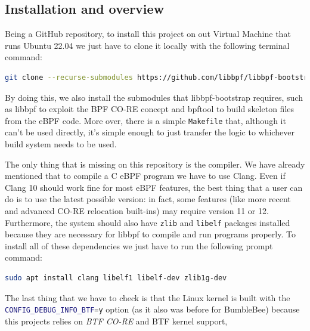 \subsection{Installation and overview}

Being a GitHub repository, to install this project on out Virtual Machine that runs Ubuntu 22.04 we just have to clone it locally with the following terminal command:

\begin{lstlisting}[style=commandline, language=bash, caption={Clone libbpf-bootstrap command.}]
	git clone --recurse-submodules https://github.com/libbpf/libbpf-bootstrap
\end{lstlisting}

By doing this, we also install the submodules that libbpf-bootstrap requires, such as  libbpf to exploit the BPF CO-RE concept and bpftool to build skeleton files from the eBPF code.
More over, there is a simple \colorbox{backcolour}{\lstinline[style=commandline, language=bash, breaklines=true]|Makefile|} that, although it can't be used directly, it's simple enough to just transfer the logic to whichever build system needs to be used.

The only thing that is missing on this repository is the compiler.
We have already mentioned that to compile a C eBPF program we have to use Clang.
Even if Clang 10 should work fine for most eBPF features, the best thing that a user can do is to use the latest possible version: in fact, some features (like more recent and advanced CO-RE relocation built-ins) may require version 11 or 12.
Furthermore, the system should also have \colorbox{backcolour}{\lstinline[style=commandline, language=bash, breaklines=true]|zlib|} and \colorbox{backcolour}{\lstinline[style=commandline, language=bash, breaklines=true]|libelf|} packages installed because they are necessary for libbpf to compile and run programs properly.
To install all of these dependencies we just have to run the following prompt command:

\begin{lstlisting}[style=commandline, language=bash, caption={Install libbpf-bootstrap dependencies command.}]
	sudo apt install clang libelf1 libelf-dev zlib1g-dev
\end{lstlisting}

The last thing that we have to check is that the Linux kernel is built with the \colorbox{backcolour}{\lstinline[style=commandline, language=bash, breaklines=true]|CONFIG_DEBUG_INFO_BTF=y|} option (as it also was before for BumbleBee) because this projects relies on \textit{BTF CO-RE} and BTF kernel support,

